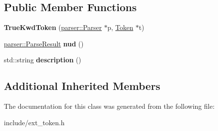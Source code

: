 \subsection*{Public Member Functions}
\begin{DoxyCompactItemize}
\item 
{\bfseries True\+Kwd\+Token} (\hyperlink{classfcal_1_1parser_1_1Parser}{parser\+::\+Parser} $\ast$p, \hyperlink{classfcal_1_1scanner_1_1Token}{Token} $\ast$t)\hypertarget{classfcal_1_1scanner_1_1TrueKwdToken_a69b9cddc8e90e93984aadf7306159661}{}\label{classfcal_1_1scanner_1_1TrueKwdToken_a69b9cddc8e90e93984aadf7306159661}

\item 
\hyperlink{classfcal_1_1parser_1_1ParseResult}{parser\+::\+Parse\+Result} {\bfseries nud} ()\hypertarget{classfcal_1_1scanner_1_1TrueKwdToken_ad3813f27375db4cc57df86bf8a446546}{}\label{classfcal_1_1scanner_1_1TrueKwdToken_ad3813f27375db4cc57df86bf8a446546}

\item 
std\+::string {\bfseries description} ()\hypertarget{classfcal_1_1scanner_1_1TrueKwdToken_a18a6762dac43654ff2df03c3c19d692e}{}\label{classfcal_1_1scanner_1_1TrueKwdToken_a18a6762dac43654ff2df03c3c19d692e}

\end{DoxyCompactItemize}
\subsection*{Additional Inherited Members}


The documentation for this class was generated from the following file\+:\begin{DoxyCompactItemize}
\item 
include/ext\+\_\+token.\+h\end{DoxyCompactItemize}
